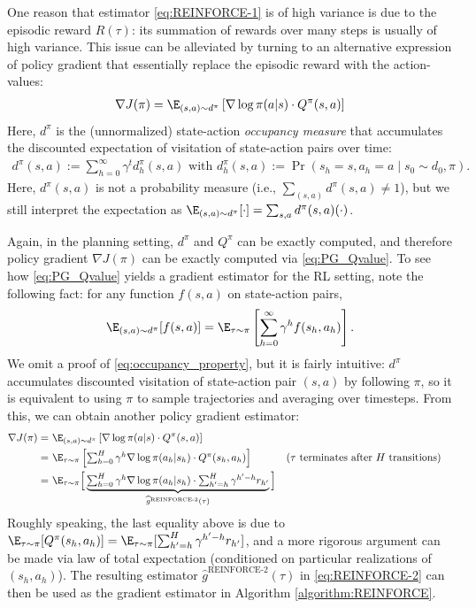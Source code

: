 One reason that estimator \eqref{eq:REINFORCE-1} is of high variance is due to the episodic reward $R(\tau)$: its summation of rewards over many steps is usually of high variance.
This issue can be alleviated by turning to an alternative expression of policy gradient that essentially replace the episodic reward with the action-values:
\begin{align}
\label{eq:PG_Qvalue}
    \nabla J(\pi) = \E_{(s,a)\sim d^\pi}\left[\nabla\log\pi(a|s)\cdot Q^\pi(s,a)\right]
\end{align}
Here, $d^\pi$ is the (unnormalized) state-action {\em occupancy measure} that accumulates the discounted expectation of visitation of state-action pairs over time:
\begin{align*}
    d^\pi(s,a):=\sum_{h=0}^{\infty}\gamma^t d_h^\pi(s,a)
    \text{ with }
    d_h^\pi(s,a):=\Pr(s_h=s, a_h=a \mid s_0\sim d_0, \pi).
\end{align*}
Here, $d^\pi(s,a)$ is not a probability measure (i.e., $\sum_{(s,a)}d^\pi(s,a) \neq 1$), but we still interpret the expectation as $\E_{(s,a)\sim d^\pi}[\cdot] = \sum_{s,a}d^\pi(s,a)(\cdot)$.

Again, in the planning setting, $d^\pi$ and $Q^\pi$ can be exactly computed, and therefore policy gradient $\nabla J(\pi)$ can be exactly computed via \eqref{eq:PG_Qvalue}.
To see how \eqref{eq:PG_Qvalue} yields a gradient estimator for the RL setting, note the following fact: 
for any function $f(s,a)$ on state-action pairs, 
\begin{align}
\label{eq:occupancy_property}
    \E_{(s,a)\sim d^\pi}[f(s,a)] = \E_{\tau\sim\pi}\left[\sum_{h=0}^\infty \gamma^h f(s_h,a_h)\right].
\end{align}
We omit a proof of \eqref{eq:occupancy_property}, but it is fairly intuitive:
$d^\pi$ accumulates discounted visitation of state-action pair $(s,a)$ by following $\pi$, so it is equivalent to using $\pi$ to sample trajectories and averaging over timesteps.
From this, we can obtain another policy gradient estimator:
\begin{align}
    \nabla J(\pi) =&~ \E_{(s,a)\sim d^\pi}\left[\nabla\log\pi(a|s)\cdot Q^\pi(s,a)\right] \nonumber\\
    =&~\E_{\tau\sim\pi}\left[\textstyle\sum_{h=0}^{H}\gamma^h \nabla\log\pi(a_h|s_h)\cdot Q^\pi(s_h,a_h)\right] && \text{($\tau$ terminates after $H$ transitions)}\nonumber\\
    =&~\E_{\tau\sim\pi}\Big[\underbrace{\textstyle\sum_{h=0}^{H}\gamma^h \nabla\log\pi(a_h|s_h)\cdot \sum_{h'=h}^H \gamma^{h'-h} r_{h'}}_{{\widehat{g}^{\text{REINFORCE-2}}(\tau)}}\Big] \label{eq:REINFORCE-2}
\end{align}
Roughly speaking, the last equality above is due to $\E_{\tau\sim\pi}[Q^\pi(s_h,a_h)] = \E_{\tau\sim\pi}[\sum_{h'=h}^H \gamma^{h'-h} r_{h'}]$, and a more rigorous argument can be made via law of total expectation (conditioned on particular realizations of $(s_h,a_h)$).
The resulting estimator $\widehat{g}^{\text{REINFORCE-2}}(\tau)$ in \eqref{eq:REINFORCE-2} can then be used as the gradient estimator in Algorithm \ref{algorithm:REINFORCE}.

